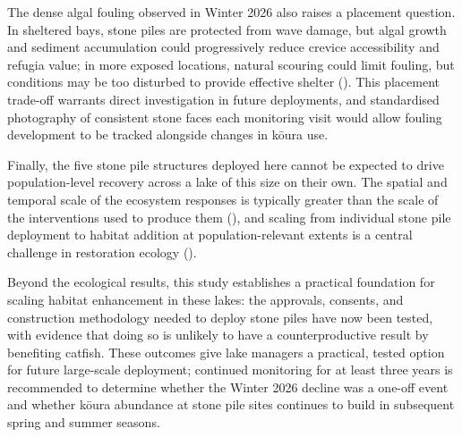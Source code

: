 \documentclass[
  letterpaper,
  DIV=11,
  numbers=noendperiod]{scrartcl}
\begin{document}
The dense algal fouling observed in Winter 2026 also raises a placement
question. In sheltered bays, stone piles are protected from wave damage,
but algal growth and sediment accumulation could progressively reduce
crevice accessibility and refugia value; in more exposed locations,
natural scouring could limit fouling, but conditions may be too
disturbed to provide effective shelter (). This placement trade-off warrants direct
investigation in future deployments, and standardised photography of
consistent stone faces each monitoring visit would allow fouling
development to be tracked alongside changes in kōura use.

Finally, the five stone pile structures deployed here cannot be expected
to drive population-level recovery across a lake of this size on their
own. The spatial and temporal scale of the ecosystem responses is
typically greater than the scale of the interventions used to produce
them (), and scaling from
individual stone pile deployment to habitat addition at
population-relevant extents is a central challenge in restoration
ecology ().

Beyond the ecological results, this study establishes a practical
foundation for scaling habitat enhancement in these lakes: the
approvals, consents, and construction methodology needed to deploy stone
piles have now been tested, with evidence that doing so is unlikely to
have a counterproductive result by benefiting catfish. These outcomes
give lake managers a practical, tested option for future large-scale
deployment; continued monitoring for at least three years is recommended
to determine whether the Winter 2026 decline was a one-off event and
whether kōura abundance at stone pile sites continues to build in
subsequent spring and summer seasons.
\end{document}
